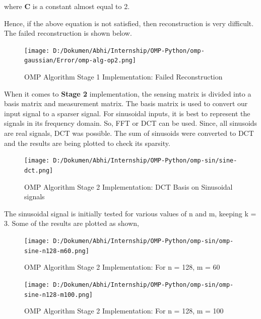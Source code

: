 \documentclass[
  letterpaper,
  DIV=11,
  numbers=noendperiod]{scrartcl}
\begin{document}
where \textbf{C} is a constant almost equal to 2.

Hence, if the above equation is not satisfied, then reconstruction is
very difficult. The failed reconstruction is shown below.

\begin{figure}[H]

{\centering \texttt{[image: D:/Dokumen/Abhi/Internship/OMP-Python/omp-gaussian/Error/omp-alg-op2.png]}

}

\caption{OMP Algorithm Stage 1 Implementation: Failed Reconstruction}

\end{figure}%

When it comes to \textbf{Stage 2} implementation, the sensing matrix is
divided into a basis matrix and measurement matrix. The basis matrix is
used to convert our input signal to a sparser signal. For sinusoidal
inputs, it is best to represent the signals in its frequency domain. So,
FFT or DCT can be used. Since, all sinusoids are real signals, DCT was
possible. The sum of sinusoids were converted to DCT and the results are
being plotted to check its sparsity.

\begin{figure}[H]

{\centering \texttt{[image: D:/Dokumen/Abhi/Internship/OMP-Python/omp-sin/sine-dct.png]}

}

\caption{OMP Algorithm Stage 2 Implementation: DCT Basis on Sinusoidal
signals}

\end{figure}%

The sinusoidal signal is initially tested for various values of n and m,
keeping k = 3. Some of the results are plotted as shown,

\begin{figure}[H]

{\centering \texttt{[image: D:/Dokumen/Abhi/Internship/OMP-Python/omp-sin/omp-sine-n128-m60.png]}

}

\caption{OMP Algorithm Stage 2 Implementation: For n = 128, m = 60}

\end{figure}%

\begin{figure}[H]

{\centering \texttt{[image: D:/Dokumen/Abhi/Internship/OMP-Python/omp-sin/omp-sine-n128-m100.png]}

}

\caption{OMP Algorithm Stage 2 Implementation: For n = 128, m = 100}

\end{figure}%
\end{document}
